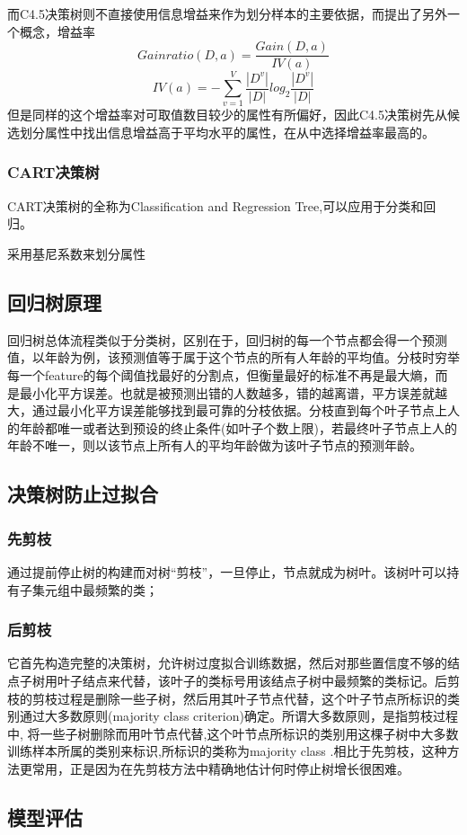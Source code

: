 \documentclass[18pt,a4paper,oneside,UTF8]{ctexart}
\begin{document}
而C4.5决策树则不直接使用信息增益来作为划分样本的主要依据，而提出了另外一个概念，增益率
\[
    Gainratio(D,a)=\frac {Gain(D,a)}{IV(a)}    
\]
\[
    IV(a)=-\sum_{v=1}^V \frac {|D^v|}{|D|}log_2\frac {|D^v|}{|D|}   
\]
但是同样的这个增益率对可取值数目较少的属性有所偏好，因此C4.5决策树先从候选划分属性中找出信息增益高于平均水平的属性，在从中选择增益率最高的。
\subsubsection{CART决策树}
CART决策树的全称为Classification and Regression Tree,可以应用于分类和回归。

采用基尼系数来划分属性
\subsection{回归树原理}
回归树总体流程类似于分类树，区别在于，回归树的每一个节点都会得一个预测值，以年龄为例，该预测值等于属于这个节点的所有人年龄的平均值。分枝时穷举每一个feature的每个阈值找最好的分割点，但衡量最好的标准不再是最大熵，而是最小化平方误差。也就是被预测出错的人数越多，错的越离谱，平方误差就越大，通过最小化平方误差能够找到最可靠的分枝依据。分枝直到每个叶子节点上人的年龄都唯一或者达到预设的终止条件(如叶子个数上限)，若最终叶子节点上人的年龄不唯一，则以该节点上所有人的平均年龄做为该叶子节点的预测年龄。
\subsection{决策树防止过拟合}
\subsubsection{先剪枝}
通过提前停止树的构建而对树“剪枝”，一旦停止，节点就成为树叶。该树叶可以持有子集元组中最频繁的类；
\subsubsection{后剪枝}
它首先构造完整的决策树，允许树过度拟合训练数据，然后对那些置信度不够的结点子树用叶子结点来代替，该叶子的类标号用该结点子树中最频繁的类标记。后剪枝的剪枝过程是删除一些子树，然后用其叶子节点代替，这个叶子节点所标识的类别通过大多数原则(majority class criterion)确定。所谓大多数原则，是指剪枝过程中, 将一些子树删除而用叶节点代替,这个叶节点所标识的类别用这棵子树中大多数训练样本所属的类别来标识,所标识的类称为majority class .相比于先剪枝，这种方法更常用，正是因为在先剪枝方法中精确地估计何时停止树增长很困难。
\subsection{模型评估}
\end{document}
